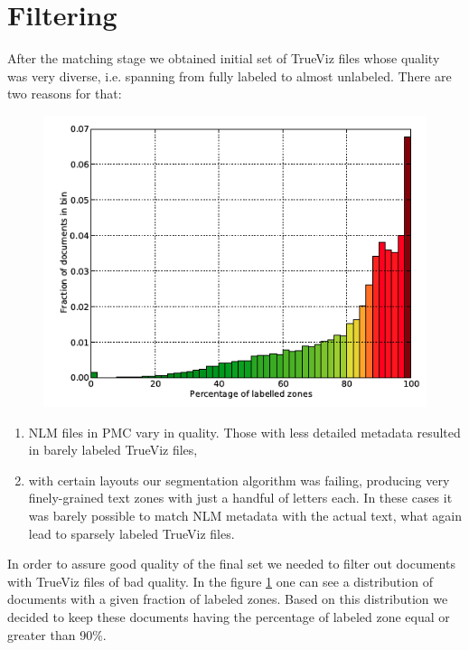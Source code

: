 \section{Filtering}
After the matching stage we obtained initial set of TrueViz files whose quality was very diverse, i.e. spanning from fully labeled to almost unlabeled. There are two reasons for that:
\begin{figure}[ht!]
  \centering
  \includegraphics[width=12cm]{plots/zone_coverage_grotoap2}
  \label{fig:trueviz_match_histogram}
\end{figure}
\begin{enumerate}
\item NLM files in PMC vary in quality. Those with less detailed metadata resulted in barely labeled TrueViz files,
\item with certain layouts our segmentation algorithm was failing, producing very finely-grained text zones with just a handful of letters each. In these cases it was barely possible to match NLM metadata with the actual text, what again lead to sparsely labeled TrueViz files. 
\end{enumerate}
In order to assure good quality of the final set we needed to filter out documents with TrueViz files of bad quality. In the figure \ref{fig:trueviz_match_histogram} one can see a distribution of documents with a given fraction of labeled zones.
Based on this distribution we decided to keep these documents having the percentage of labeled zone equal or greater than 90\%.

